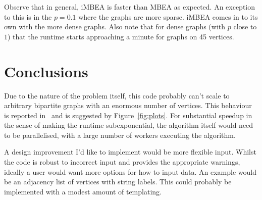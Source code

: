 Observe that in general, iMBEA is faster than MBEA as expected.
An exception to this is in the $p=0.1$ where the graphs are more sparse.
iMBEA comes in to its own with the more dense graphs.
Also note that for dense graphs (with $p$ close to $1$) that the runtime starts approaching a minute for graphs on 45 vertices.

\section{Conclusions}

Due to the nature of the problem itself, this code probably can't scale to arbitrary bipartite graphs with an enormous number of vertices.
This behaviour is reported in~\cite{Zhang2014} and is suggested by Figure~\ref{fig:plots}.
For substantial speedup in the sense of making the runtime subexponential, the algorithm itself would need to be parallelised, with a large number of workers executing the algorithm.

A design improvement I'd like to implement would be more flexible input.
Whilst the code is robust to incorrect input and provides the appropriate warnings, ideally a user would want more options for how to input data.
An example would be an adjacency list of vertices with string labels.
This could probably be implemented with a modest amount of templating.

